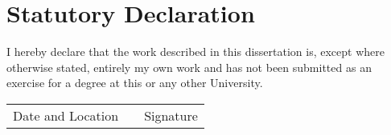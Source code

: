 \chapter*{Statutory Declaration}

I hereby declare that the work described in this dissertation is, except where otherwise stated, entirely my own work and has not been submitted as an exercise for a degree at this or any other University.



\vspace{7cm}

\begin{tabular}{p{}cp{}}
  \cline{1-1} \cline{3-3} \\
  \centering Date and Location & & \centering Signature 
\end{tabular}